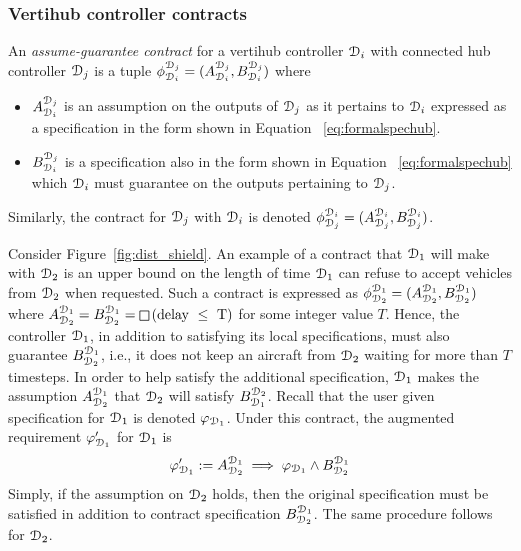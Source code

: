  \subsubsection{Vertihub controller contracts}
 An \emph{assume-guarantee contract} for a vertihub controller $\mathcal{D}_i$ with connected hub controller $\mathcal{D}_j$ is a tuple $\mathcal \phi_{\mathcal{D}_i}^{\mathcal{D}_j} = (A_{\mathcal{D}_i}^{\mathcal{D}_j},B_{\mathcal{D}_i}^{\mathcal{D}_j})$ where
\begin{itemize}
\item $A_{\mathcal{D}_i}^{\mathcal{D}_j}$ is an assumption on the outputs of $\mathcal{D}_j$ as it pertains to ${\mathcal{D}_i}$ expressed as a specification in the form shown in Equation ~\eqref{eq:formalspechub}. 
\item $B_{\mathcal{D}_i}^{\mathcal{D}_j}$ is a specification also in the form shown in Equation ~\eqref{eq:formalspechub}  which $\mathcal{D}_i$ must guarantee on the outputs pertaining to $\mathcal{D}_j$.
\end{itemize}
Similarly, the contract for $\mathcal{D}_j$ with $\mathcal{D}_i$ is denoted $\mathcal \phi_{\mathcal{D}_j}^{\mathcal{D}_i} = (A_{\mathcal{D}_j}^{\mathcal{D}_i},B_{\mathcal{D}_j}^{\mathcal{D}_i})$.


\begin{eg}
Consider Figure~\ref{fig:dist_shield}. An example of a contract that $\mathcal{D}_1$ will make with $\mathcal{D}_2$ is an upper bound on the length of time $\mathcal{D}_1$ can refuse to accept vehicles from $\mathcal{D}_2$ when requested. Such a contract is expressed as $\phi_{\mathcal{D}_2}^{\mathcal{D}_1}= (A_{\mathcal{D}_2}^{\mathcal{D}_1},B_{\mathcal{D}_2}^{\mathcal{D}_1})$ where $A_{\design_2}^{\design_1} = B_{\design_2}^{\design_1} = \LTLglobally \left(\text{delay } \leq \text{ T}\right)$ for some integer value $T$. Hence, the controller $\mathcal{D}_1$, in addition to satisfying its local specifications, must also guarantee $B_{\mathcal{D}_2}^{\mathcal{D}_1}$, i.e., it does not keep an aircraft from $\mathcal{D}_2$ waiting for more than $T$ timesteps. In order to help satisfy the additional specification, $\mathcal{D}_1$ makes the assumption $A_{\mathcal{D}_2}^{\mathcal{D}_1}$ that $\mathcal{D}_2$ will satisfy $B_{\mathcal{D}_1}^{\mathcal{D}_2}$. Recall that the user given specification for $\mathcal{D}_1$ is denoted $\varphi_{\mathcal{D}_1}$. Under this contract, the augmented requirement $\varphi_{\mathcal{D}_1}'$ for $\mathcal{D}_1$ is
$$ \varphi_{\mathcal{D}_1}' := A_{\mathcal{D}_2}^{\mathcal{D}_1} \implies \varphi_{\mathcal{D}_1} \wedge B_{\mathcal{D}_2}^{\mathcal{D}_1} $$
Simply, if the assumption on $\mathcal{D}_2$ holds, then the original specification must be satisfied in addition to contract specification $B_{\mathcal{D}_2}^{\mathcal{D}_1}$. The same procedure follows for $\mathcal{D}_2$. \end{eg}


